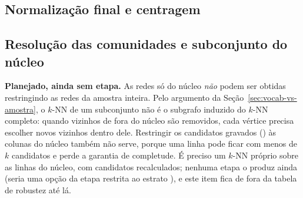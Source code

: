 \subsection{Normalização final e centragem}

\subsection{Resolução das comunidades e subconjunto do núcleo}

\textbf{Planejado, ainda sem etapa.} As redes só do núcleo \emph{não} podem ser obtidas
restringindo as redes da amostra inteira. Pelo argumento da Seção~\ref{sec:vocab-vs-amostra}, o
$k$-NN de um subconjunto não é o subgrafo induzido do $k$-NN completo: quando vizinhos de fora
do núcleo são removidos, cada vértice precisa escolher novos vizinhos dentro dele. Restringir
os candidatos gravados () às colunas do núcleo também não serve, porque uma
linha pode ficar com menos de $k$ candidatos e perde a garantia de completude. É preciso um
$k$-NN próprio sobre as linhas do núcleo, com candidatos recalculados; nenhuma etapa o produz
ainda (seria uma opção da etapa  restrita ao estrato ), e este item fica
de fora da tabela de robustez até lá.
